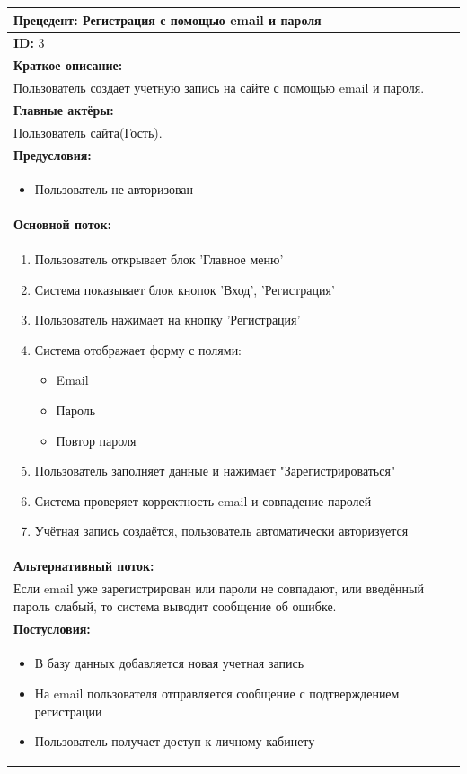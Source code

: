 \documentclass{scrreprt}
\begin{document}
\vspace{10px}
\noindent
\begin{tabularx}{\textwidth}{|X|}
	\hline
	\textbf{Прецедент: Регистрация с помощью email и пароля} \\
	\hline
	\textbf{ID:} 3 \\
	\hline
	\textbf{Краткое описание:} \\
	Пользователь создает учетную запись на сайте с помощью email и пароля. \\
	\hline
	\textbf{Главные актёры:} \\
	Пользователь сайта(Гость). \\
	\hline
	\textbf{Предусловия:} \\
	\begin{itemize}[nosep,leftmargin=*]
		\item Пользователь не авторизован
	\end{itemize} \\
	\hline
	\textbf{Основной поток:} \\
	\begin{enumerate}[nosep,leftmargin=*]
		\item Пользователь открывает блок 'Главное меню'
		\item Система показывает блок кнопок 'Вход', 'Регистрация'
		\item Пользователь нажимает на кнопку 'Регистрация'
		\item Система отображает форму с полями:
		\begin{itemize}[nosep, leftmargin=*]
			\item Email
			\item Пароль
			\item Повтор пароля
		\end{itemize}
		\item Пользователь заполняет данные и нажимает "Зарегистрироваться"
		\item Система проверяет корректность email и совпадение паролей
		\item Учётная запись создаётся, пользователь автоматически авторизуется
	\end{enumerate} \\
	\hline
	\textbf{Альтернативный поток:} \\
	Если email уже зарегистрирован или пароли не совпадают, или введённый пароль слабый, то система выводит сообщение об ошибке.\\
	\hline
	\textbf{Постусловия:} \\
	\begin{itemize}[nosep,leftmargin=*]
		\item В базу данных добавляется новая учетная запись
		\item На email пользователя отправляется сообщение с подтверждением регистрации
		\item Пользователь получает доступ к личному кабинету
	\end{itemize} \\
	\hline
\end{tabularx}
\end{document}
